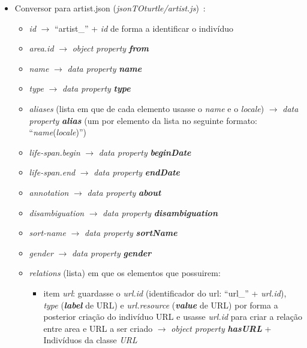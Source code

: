 \documentclass{article}
\begin{document}
\begin{itemize}
\begin{itemize}
\begin{itemize}
                \end{itemize}
        \end{itemize}
    \item Conversor para artist.json (\textit{jsonTOturtle/artist.js})~\cite{mbArt}:
        \begin{itemize}
            \item \textit{id} $\to$ ``artist\_'' + \textit{id} de forma a identificar o indivíduo
            \item \textit{area.id} $\to$ \textit{object property} \textit{\textbf{from}}
            \item \textit{name} $\to$ \textit{data property} \textit{\textbf{name}}
            \item \textit{type} $\to$ \textit{data property} \textit{\textbf{type}}
            \item \textit{aliases} (lista em que de cada elemento usasse o \textit{name} e o \textit{locale}) $\to$ \textit{data property} \textit{\textbf{alias}} (um por elemento da lista no seguinte formato: ``\textit{name}(\textit{locale})'')
            \item \textit{life-span.begin} $\to$ \textit{data property} \textit{\textbf{beginDate}}
            \item \textit{life-span.end} $\to$ \textit{data property} \textit{\textbf{endDate}}
            \item \textit{annotation} $\to$ \textit{data property} \textit{\textbf{about}}
            \item \textit{disambiguation} $\to$ \textit{data property} \textit{\textbf{disambiguation}}
            \item \textit{sort-name} $\to$ \textit{data property} \textit{\textbf{sortName}}
            \item \textit{gender} $\to$ \textit{data property} \textit{\textbf{gender}}
            \item \textit{relations} (lista) em que os elementos que possuirem:
                \begin{itemize}
                    \item item \textit{url}: guardasse o \textit{url.id} (identificador do url: ``url\_'' + \textit{url.id}), \textit{type} (\textit{\textbf{label}} de URL) e \textit{url.resource} (\textit{\textbf{value}} de URL) por forma a posterior criação do indivíduo URL e usasse \textit{url.id} para criar a relação entre area e URL a ser criado $\to$ \textit{object property} \textit{\textbf{hasURL}} + Indivíduos da classe \textit{URL}

\end{itemize}
\end{itemize}
\end{itemize}
\end{document}
